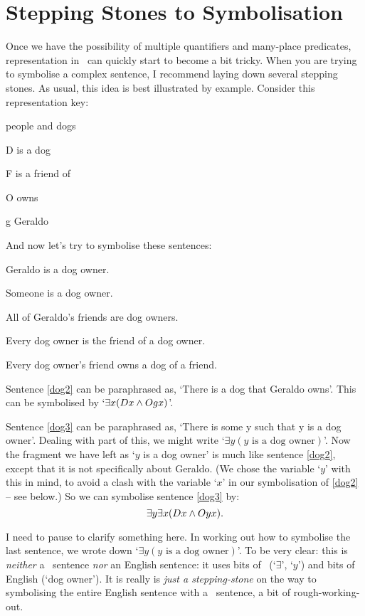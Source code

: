\section{Stepping Stones to Symbolisation}
Once we have the possibility of multiple quantifiers and many-place predicates, representation in \FOL\ can quickly start to become a bit tricky. When you are trying to symbolise a complex sentence, I recommend laying down several stepping stones. As usual, this idea is best illustrated by example. Consider this representation key:
\begin{ekey}
\item[\domain] people and dogs
\item[D]  is a dog
\item[F]  is a friend of 
\item[O]  owns 
\item[g] Geraldo
\end{ekey}
And now let's try to symbolise these sentences:
\begin{earg}
\item[\ex{dog2}] Geraldo is a dog owner.
\item[\ex{dog3}] Someone is a dog owner.
\item[\ex{dog4}] All of Geraldo's friends are dog owners.
\item[\ex{dog5}] Every dog owner is the friend of a dog owner.
\item[\ex{dog6}] Every dog owner's friend owns a dog of a friend.
\end{earg}
Sentence \ref{dog2} can be paraphrased as, `There is a dog that Geraldo owns'. This can be symbolised by `$\exists x(Dx \wedge Ogx)$'.

Sentence \ref{dog3} can be paraphrased as, `There is some y such that y is a dog owner'. Dealing with part of this, we might write `$\exists y(y\text{ is a dog owner})$'. Now the fragment we have left as `$y$ is a dog owner' is much like sentence \ref{dog2}, except that it is not specifically about Geraldo. (We chose the variable `$y$' with this in mind, to avoid a clash with the variable `$x$' in our symbolisation of \ref{dog2} – see below.) So we can symbolise sentence \ref{dog3} by:
$$\exists y \exists x(Dx \wedge Oyx).$$ 


I need to pause to clarify something here. In working out how to symbolise the last sentence, we wrote down `$\exists y(y\text{ is a dog owner})$'. To be very clear: this is \emph{neither} a \FOL\ sentence \emph{nor} an English sentence: it uses bits of \FOL\ (`$\exists$', `$y$') and bits of English (`dog owner'). It is really is \emph{just a stepping-stone} on the way to symbolising the entire English sentence with a \FOL\ sentence, a bit of rough-working-out.

